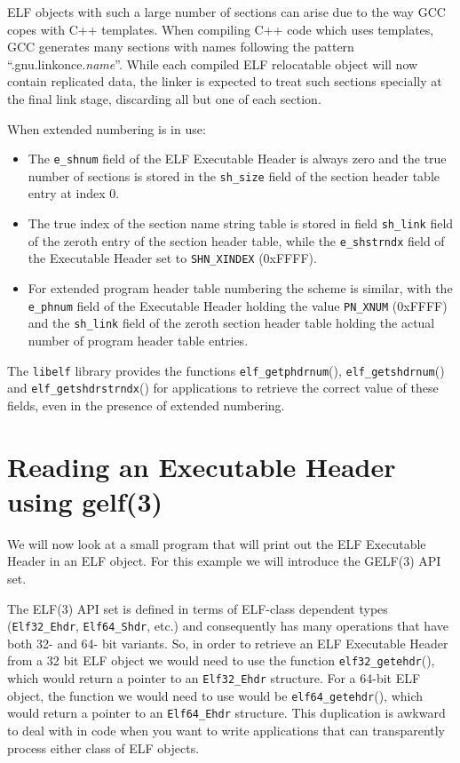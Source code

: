 \documentclass[a4paper]{book}
\newcommand{\constant}[1]{\texttt{#1}}
\newcommand{\function}[1]{\texttt{#1}()}
\newcommand{\library}[1]{\texttt{#1}}
\newcommand{\parameter}[1]{\texttt{#1}}
\newcommand{\type}[1]{\texttt{#1}}
\begin{document}
ELF objects with such a large number of sections can arise due to the
way GCC copes with C++ templates.  When compiling C++ code which uses
templates, GCC generates many sections with names following the
pattern ``.gnu.linkonce.\textit{name}''.  While each compiled ELF
relocatable object will now contain replicated data, the linker is
expected to treat such sections specially at the final link stage,
discarding all but one of each section.

When extended numbering is in use:

\begin{itemize}
\item The \parameter{e\_shnum} field of the ELF Executable Header is
  always zero and the true number of sections is stored in the
  \parameter{sh\_size} field of the section header table entry at
  index 0.
\item The true index of the section name string table is stored in
  field \parameter{sh\_link} field of the zeroth entry of the section
  header table, while the \parameter{e\_shstrndx} field of the
  Executable Header set to \constant{SHN\_XINDEX} (0xFFFF).
\item For extended program header table numbering the scheme is similar,
  with the \parameter{e\_phnum} field of the Executable Header holding
  the value \constant{PN\_XNUM} (0xFFFF) and the
  \parameter{sh\_link} field of the zeroth section header table holding
  the actual number of program header table entries.
\end{itemize}

The \library{libelf} library provides the functions
\function{elf\_getphdrnum}, \function{elf\_getshdrnum} and
\function{elf\_getshdrstrndx} for applications to retrieve the correct
value of these fields, even in the presence of extended numbering.

\section{Reading an Executable Header using gelf(3)}

We will now look at a small program that will print out the ELF
Executable Header in an ELF object. For this example we will introduce
the GELF(3) API set.

The ELF(3) API set is defined in terms of ELF-class dependent types
(\type{Elf32\_Ehdr}, \type{Elf64\_Shdr}, etc.) and consequently has
many operations that have both 32- and 64- bit variants.  So, in order
to retrieve an ELF Executable Header from a 32 bit ELF object we would
need to use the function \function{elf32\_getehdr}, which would return
a pointer to an \type{Elf32\_Ehdr} structure.  For a 64-bit ELF
object, the function we would need to use would be
\function{elf64\_getehdr}, which would return a pointer to an
\type{Elf64\_Ehdr} structure.  This duplication is awkward to deal
with in code when you want to write applications that can
transparently process either class of ELF objects.
\end{document}
